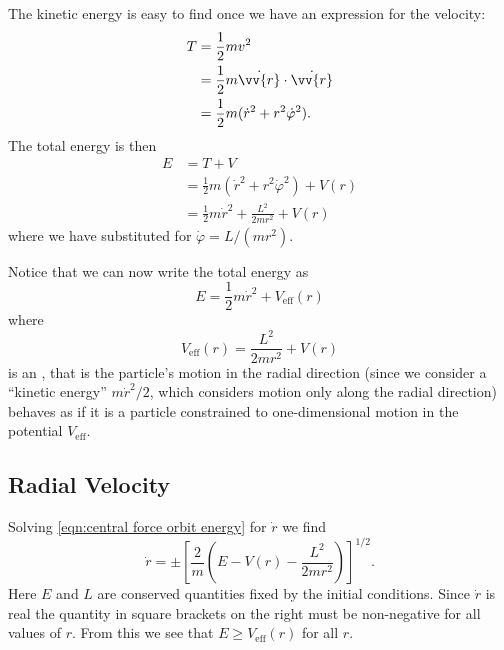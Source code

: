\documentclass[fleqn]{NotesClass}
\newcommand*{\eff}{\mathrm{eff}}
\begin{document}
    The kinetic energy is easy to find once we have an expression for the velocity:
    \begin{align}
        T &= \frac{1}{2}mv^2\\
        &= \frac{1}{2}m\dot{\vv{r}}\cdot\dot{\vv{r}}\\
        &= \frac{1}{2}m(\dot{r}^2 + r^2\dot{\varphi}^2).
    \end{align}
    The total energy is then
    \begin{align}
        E &= T + V\\
        &= \frac{1}{2}m(\dot{r}^2 + r^2\dot{\varphi}^2) + V(r)\\
        &= \frac{1}{2}m\dot{r}^2 + \frac{L^2}{2mr^2} + V(r)\label{eqn:central force orbit energy}
    \end{align}
    where we have substituted for \(\dot{\varphi} = L/(mr^2)\).
    
    Notice that we can now write the total energy as
    \begin{equation}
        E = \frac{1}{2}m\dot{r}^2 + V_\eff(r)
    \end{equation}
    where
    \begin{equation}
        V_{\eff}(r) = \frac{L^2}{2mr^2} + V(r)
    \end{equation}
    is an , that is the particle's motion in the radial direction (since we consider a \enquote{kinetic energy} \(m\dot{r}^2/2\), which considers motion only along the radial direction) behaves as if it is a particle constrained to one-dimensional motion in the potential \(V_\eff\).
    
    \subsection{Radial Velocity}
    Solving \cref{eqn:central force orbit energy} for \(\dot{r}\) we find
    \begin{equation}\label{eqn:central potential radial velocity}
        \dot{r} = \pm \left[ \frac{2}{m}\left( E - V(r) - \frac{L^2}{2mr^2} \right) \right]^{1/2}.
    \end{equation}
    Here \(E\) and \(L\) are conserved quantities fixed by the initial conditions.
    Since \(\dot{r}\) is real the quantity in square brackets on the right must be non-negative for all values of \(r\).
    From this we see that \(E \ge V_{\eff}(r)\) for all \(r\).
    
\end{document}
